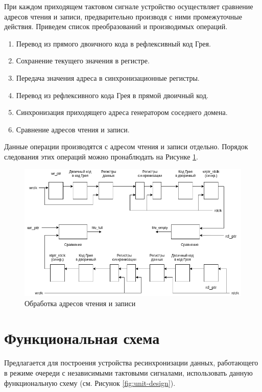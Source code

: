 При каждом приходящем тактовом сигнале устройство осуществляет сравнение адресов чтения и записи, предварительно производя с ними промежуточные действия. Приведем список преобразований и производимых операций.

\begin{enumerate}
	\item Перевод из прямого двоичного кода в рефлексивный код Грея.
	\item Сохранение текущего значения в регистре.
	\item Передача значения адреса в синхронизационные регистры.
	\item Перевод из рефлексивного кода Грея в прямой двоичный код.
	\item Синхронизация приходящего адреса генератором соседнего домена. %
	\item Сравнение адресов чтения и записи.
\end{enumerate}

Данные операции производятся с адресом чтения и записи отдельно. Порядок следования этих операций можно пронаблюдать на Рисунке \ref{fig:signal-process}.

\begin{figure}
	\centering
	\includegraphics[width=1\linewidth]{course-scheme/images/signal-process}
	\caption{Обработка адресов чтения и записи}
	\label{fig:signal-process}
\end{figure}



\section{Функциональная схема}
Предлагается для построения устройства ресинхронизации данных, работающего в режиме очереди с независимыми тактовыми сигналами, использовать данную функциональную схему (см. Рисунок \ref{fig:unit-design}).

